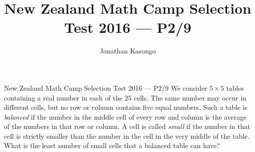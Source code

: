 \documentclass{article}
\author{Jonathan Kasongo}
\title{New Zealand Math Camp Selection Test 2016 --- P2/9}
\begin{document}
\maketitle

\begin{problem}{New Zealand Math Camp Selection Test 2016 --- P2/9}
We consider $5 \times 5$ tables containing a real number in each of the 25 cells. The same number may occur in different cells, but no row or column contains five equal numbers. Such a table is \textit{balanced} if the number in the middle cell of every row and column is the average of the numbers in that row or column. A cell is called \textit{small} if the number in that cell is strictly smaller than the number in the cell in the very middle of the table. What is the least number of small cells that a balanced table can have?
\end{problem}
\end{document}
